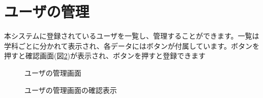 \documentclass[11ptm]{jsarticle}
\begin{document}




\clearpage
\section{ユーザの管理}
\label{sec:ユーザの管理}
本システムに登録されているユーザを一覧し、管理することができます。一覧は学科ごとに分かれて表示され、各データにはボタンが付属しています。ボタンを押すと確認画面(図\ref{fig:ユーザの管理画面の確認表示})が表示され、ボタンを押すと登録できます
\begin{figure}[h]
  \centering
  \caption{\label{fig:ユーザの管理画面}ユーザの管理画面}
\end{figure}
\begin{figure}[h]
  \centering
  \caption{\label{fig:ユーザの管理画面の確認表示}ユーザの管理画面の確認表示}
\end{figure}
\end{document}
